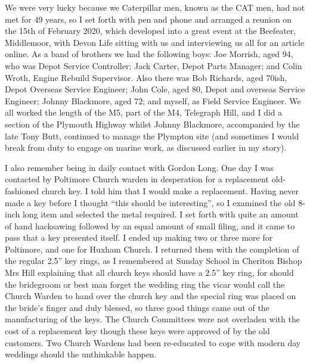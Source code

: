 We were very lucky because we Caterpillar men, known as the CAT men, had not met
for 49 years, so I set forth with pen and phone and arranged a reunion on the
15th of February 2020, which developed into a great event at the Beefeater,
Middlemoor, with Devon Life sitting with us and interviewing us all for an
article online. As a band of brothers we had the following boys: Joe Morrish,
aged 94, who was Depot Service Controller; Jack Carter, Depot Parts Manager;
and Colin Wroth, Engine Rebuild Supervisor. Also there was Bob Richards, aged
70ish, Depot Overseas Service Engineer; John Cole, aged 80, Depot and overseas
Service Engineer; Johnny Blackmore, aged 72; and myself, as Field Service
Engineer. We all worked the length of the M5, part of the M4, Telegraph Hill,
and I did a section of the Plymouth Highway whilst Johnny Blackmore, accompanied
by the late Tony Butt, continued to manage the Plympton site (and sometimes I
would break from duty to engage on marine work, as discussed earlier in my
story).

I also remember being in daily contact with Gordon Long. One day I was contacted
by Poltimore Church warden in desperation for a replacement old-fashioned
church key. I told him that I would make a replacement. Having never made a key
before I thought ``this should be interesting'', so I examined the old 8-inch
long item and selected the metal required. I set forth with quite an amount of
hand hacksawing followed by an equal amount of small filing, and it came to
pass that a key presented itself. I ended up making two or three more for
Poltimore, and one for Huxham Church. I returned them with the completion of
the regular 2.5'' key rings, as I remembered at Sunday School in Cheriton
Bishop Mrs Hill explaining that all church keys should have a 2.5'' key ring,
for should the bridegroom or best man forget the wedding ring the vicar would
call the Church Warden to hand over the church key and the special ring was
placed on the bride's finger and duly blessed, so three good things came out of
the manufacturing of the keys. The Church Committees were not overladen with
the cost of a replacement key though these keys were approved of by the old
customers. Two Church Wardens had been re-educated to cope with modern day
weddings should the unthinkable happen.
